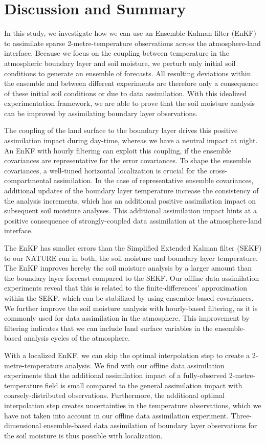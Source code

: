\documentclass[hess, manuscript]{copernicus}
\begin{document}
\section{Discussion and Summary}

In this study, we investigate how we can use an Ensemble Kalman filter (EnKF) to assimilate sparse 2-metre-temperature observations across the atmosphere-land interface.
Because we focus on the coupling between temperature in the atmospheric boundary layer and soil moisture, we perturb only initial soil conditions to generate an ensemble of forecasts.
All resulting deviations within the ensemble and between different experiments are therefore only a consequence of these initial soil conditions or due to data assimilation.
With this idealized experimentation framework, we are able to prove that
the soil moisture analysis can be improved by assimilating boundary layer observations.

The coupling of the land surface to the boundary layer drives this positive assimilation impact during day-time, whereas we have a neutral impact at night.
An EnKF with hourly filtering can exploit this coupling, if the ensemble covariances are representative for the error covariances.
To shape the ensemble covariances, a well-tuned horizontal localization is crucial for the cross-compartmental assimilation.
In the case of representative ensemble covariances, additional updates of the boundary layer temperature increase the consistency of the analysis increments, which has an additional positive assimilation impact on subsequent soil moisture analyses.
This additional assimilation impact hints at a positive consequence of strongly-coupled data assimilation at the atmosphere-land interface.

The EnKF has smaller errors than the Simplified Extended Kalman filter (SEKF) to our NATURE run in both, the soil moisture and boundary layer temperature.
The EnKF improves hereby the soil moisture analysis by a larger amount than the boundary layer forecast compared to the SEKF.
Our offline data assimilation experiments reveal that this is related to the finite-differences' approximation within the SEKF, which can be stabilized by using ensemble-based covariances.
We further improve the soil moisture analysis with hourly-based filtering, as it is commonly used for data assimilation in the atmosphere.
This improvement by filtering indicates that we can include land surface variables in the ensemble-based analysis cycles of the atmosphere.

With a localized EnKF, we can skip the optimal interpolation step to create a 2-metre-temperature analysis.
We find with our offline data assimilation experiments that the additional assimilation impact of a fully-observed 2-metre-temperature field is small compared to the general assimilation impact with coarsely-distributed observations.
Furthermore, the additional optimal interpolation step creates uncertainties in the temperature observations, which we have not taken into account in our offline data assimilation experiment.
Three-dimensional ensemble-based data assimilation of boundary layer observations for the soil moisture is thus possible with localization.
\end{document}
